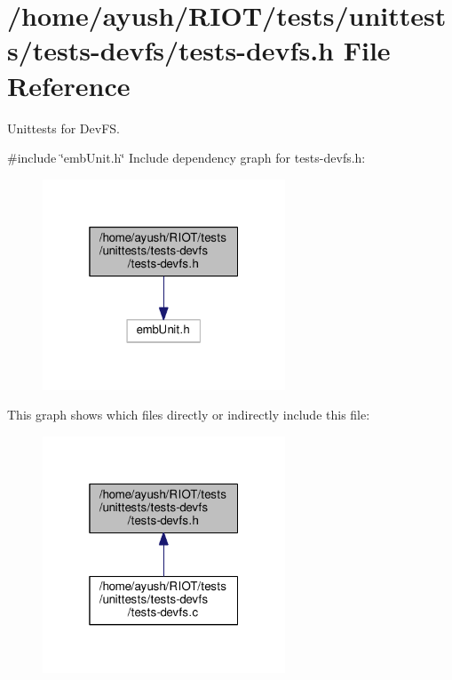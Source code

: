 \hypertarget{tests-devfs_8h}{}\section{/home/ayush/\+R\+I\+O\+T/tests/unittests/tests-\/devfs/tests-\/devfs.h File Reference}
\label{tests-devfs_8h}


Unittests for Dev\+FS.  


{\ttfamily \#include \char`\"{}emb\+Unit.\+h\char`\"{}}\newline
Include dependency graph for tests-\/devfs.h\+:
\nopagebreak
\begin{figure}[H]
\begin{center}
\leavevmode
\includegraphics[width=205pt]{tests-devfs_8h__incl}
\end{center}
\end{figure}
This graph shows which files directly or indirectly include this file\+:
\nopagebreak
\begin{figure}[H]
\begin{center}
\leavevmode
\includegraphics[width=205pt]{tests-devfs_8h__dep__incl}
\end{center}
\end{figure}
